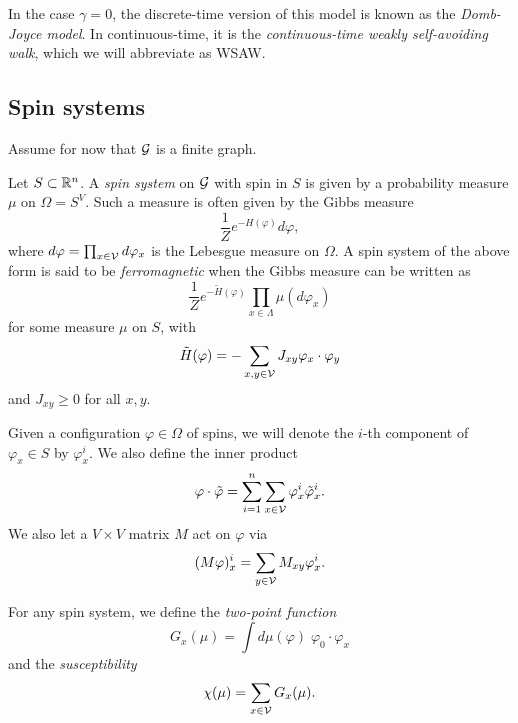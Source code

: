 In the case $\gamma = 0$, the discrete-time version of this model is known as
the \emph{Domb-Joyce model}. In continuous-time, it is the \emph{continuous-time
weakly self-avoiding walk}, which we will abbreviate as WSAW.


\subsection{Spin systems}

Assume for now that $\mathcal{G}$ is a finite graph.

Let $S \subset {\mathbb R}^n$. A \emph{spin system} on $\mathcal{G}$ with spin in $S$ is given
by a probability measure $\mu$ on $\Omega = S^V$. Such a measure is often given by the
Gibbs measure
\begin{equation}
\frac{1}{Z} e^{-H(\varphi)} d\varphi,
\end{equation}
where $d\varphi = \prod_{x\in\mathcal{V}} d\varphi_x$ is the Lebesgue measure on
$\Omega$. A spin system of the above form is said to be \emph{ferromagnetic} when
the Gibbs measure can be written as
\begin{equation}
\frac{1}{Z} e^{-\tilde H(\varphi)} \prod_{x\in\Lambda} \mu(d\varphi_x)
\end{equation}
for some measure $\mu$ on $S$, with
\begin{equation}
\tilde H(\varphi) = -\sum_{x, y \in \mathcal{V}} J_{xy} \varphi_x \cdot \varphi_y
\end{equation}
and $J_{xy} \ge 0$ for all $x, y$.

Given a configuration $\varphi \in \Omega$
of spins, we will denote the $i$-th component of $\varphi_x \in S$ by $\varphi^i_x$.
We also define the inner product
\begin{equation}
\varphi \cdot \tilde\varphi = \sum_{i=1}^n \sum_{x\in\mathcal{V}} \varphi^i_x \tilde\varphi^i_x.
\end{equation}
We also let a $V \times V$ matrix $M$ act on $\varphi$ via
\begin{equation}
(M\varphi)^i_x = \sum_{y\in\mathcal{V}} M_{xy} \varphi^i_x.
\end{equation}

For any spin system, we define the \emph{two-point function}
\begin{equation}
G_x(\mu) = \int d\mu(\varphi) \; \varphi_0 \cdot \varphi_x
\end{equation}
and the \emph{susceptibility}
\begin{equation}
\chi(\mu) = \sum_{x\in\mathcal{V}} G_x(\mu).
\end{equation}


